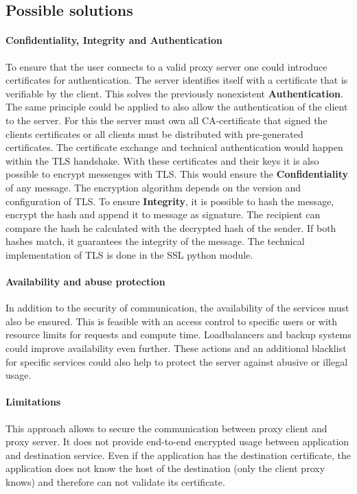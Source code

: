 \documentclass[12pt, a4paper]{scrartcl}
\begin{document}
\subsection{Possible solutions}
\paragraph{Confidentiality, Integrity and Authentication}
To ensure that the user connects to a valid proxy server one could introduce certificates for authentication. The server identifies itself with a certificate that is verifiable by the client. This solves the previously nonexistent \textbf{Authentication}. The same principle could be applied to also allow the authentication of the client to the server. For this the server must own all CA-certificate that signed the clients certificates or all clients must be distributed with pre-generated certificates.\newline
The certificate exchange and technical authentication would happen within the \ac{TLS} handshake. With these certificates and their keys it is also possible to encrypt messenges with \ac{TLS}. This would ensure the \textbf{Confidentiality} of any message. The encryption algorithm depends on the version and configuration of \ac{TLS}.\newline
To ensure \textbf{Integrity}, it is possible to hash the message, encrypt the hash and append it to message as signature. The recipient can compare the hash he calculated with the decrypted hash of the sender. If both hashes match, it guarantees the integrity of the message.\newline
The technical implementation of \ac{TLS} is done in the \ac{SSL} python module.
\paragraph{Availability and abuse protection}
In addition to the security of communication, the availability of the services must also be ensured. This is feasible with an access control to specific users or with resource limits for requests and compute time. Loadbalancers and backup systems could improve availability even further.\newline
These actions and an additional blacklist for specific services could also help to protect the server against abusive or illegal usage.
\paragraph{Limitations}
This approach allows to secure the communication between proxy client and proxy server. It does not provide end-to-end encrypted usage between application and destination service. Even if the application has the destination certificate, the application does not know the host of the destination (only the client proxy knows) and therefore can not validate its certificate.
\end{document}
